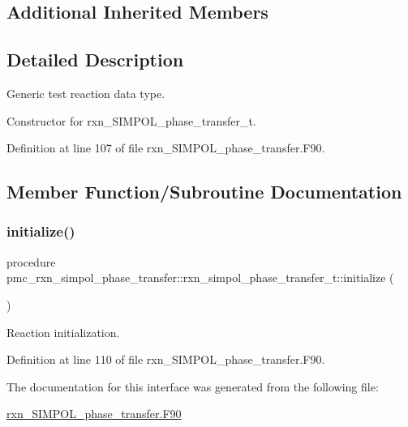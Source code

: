 \subsection*{Additional Inherited Members}


\subsection{Detailed Description}
Generic test reaction data type. 

Constructor for rxn\+\_\+\+S\+I\+M\+P\+O\+L\+\_\+phase\+\_\+transfer\+\_\+t. 

Definition at line 107 of file rxn\+\_\+\+S\+I\+M\+P\+O\+L\+\_\+phase\+\_\+transfer.\+F90.



\subsection{Member Function/\+Subroutine Documentation}
\mbox{\label{structpmc__rxn__simpol__phase__transfer_1_1rxn__simpol__phase__transfer__t_a284e2fb2a45914f13dcdcf9d5521e9bc}} 
\subsubsection{\texorpdfstring{initialize()}{initialize()}}
{\footnotesize\ttfamily procedure pmc\+\_\+rxn\+\_\+simpol\+\_\+phase\+\_\+transfer\+::rxn\+\_\+simpol\+\_\+phase\+\_\+transfer\+\_\+t\+::initialize (\begin{DoxyParamCaption}{ }\end{DoxyParamCaption})\hspace{0.3cm}{\ttfamily [private]}}



Reaction initialization. 



Definition at line 110 of file rxn\+\_\+\+S\+I\+M\+P\+O\+L\+\_\+phase\+\_\+transfer.\+F90.



The documentation for this interface was generated from the following file\+:\begin{DoxyCompactItemize}
\item 
\mbox{\hyperlink{rxn___s_i_m_p_o_l__phase__transfer_8_f90}{rxn\+\_\+\+S\+I\+M\+P\+O\+L\+\_\+phase\+\_\+transfer.\+F90}}\end{DoxyCompactItemize}
